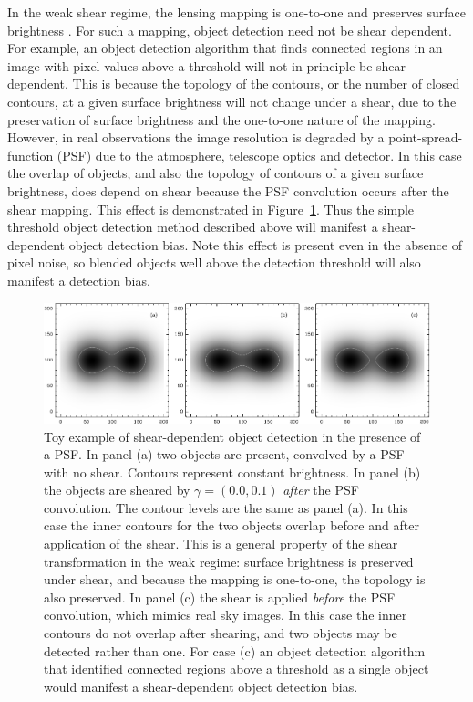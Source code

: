 \documentclass[draft, iop, twocolappendix, appendixfloats, numberedappendix, apj]{hackemulateapj}
\begin{document}
In the weak shear regime, the lensing mapping is one-to-one and preserves
surface brightness \citep{SchneiderBook92}. For such a mapping, object
detection need not be shear dependent. For example, an object detection
algorithm that finds connected regions in an image with pixel values above a
threshold will not in principle be shear dependent.  This is because the
topology of the contours, or the number of closed contours, at a given surface
brightness will not change under a shear, due to the preservation of surface
brightness and the one-to-one nature of the mapping.  However, in real
observations the image resolution is degraded by a point-spread-function (PSF)
due to the atmosphere, telescope optics and detector. In this case the overlap
of objects, and also the topology of contours of a given surface brightness,
does depend on shear because the PSF convolution occurs after the shear
mapping.  This effect is demonstrated in Figure~\ref{fig:toy}.  Thus the simple
threshold object detection method described above will manifest a
shear-dependent object detection bias.  Note this effect is present even in the
absence of pixel noise, so blended objects well above the detection threshold
will also manifest a detection bias.

\begin{figure}
    \begin{center}
        \includegraphics[width=\textwidth]{toy.pdf}

        \caption{ Toy example of shear-dependent object detection in the presence of
        a PSF.  In panel (a) two objects are present, convolved by a PSF with no
        shear.  Contours represent constant brightness.  In panel (b) the objects
        are sheared by $\gamma = (0.0, 0.1)$ {\em after} the PSF convolution.  The
        contour levels are the same as panel (a).  In this case the inner contours
        for the two objects overlap before and after application of the shear. This
        is a general property of the shear transformation in the weak regime:
        surface brightness is preserved under shear, and because the mapping is
        one-to-one, the topology is also preserved. In panel (c) the shear is
        applied {\em before} the PSF convolution, which mimics real sky images. In
        this case the inner contours do not overlap after shearing, and two objects
        may be detected rather than one.  For case (c) an object detection
        algorithm that identified connected regions above a threshold as a single
        object would manifest a shear-dependent object detection bias.
        \label{fig:toy} }
    \end{center}

\end{figure}
\end{document}
